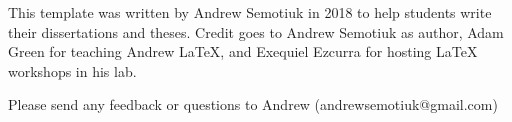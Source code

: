 This template was written by Andrew Semotiuk in 2018 to help students write their dissertations and theses. Credit goes to Andrew Semotiuk as author, Adam Green for teaching Andrew LaTeX, and Exequiel Ezcurra for hosting LaTeX workshops in his lab.

Please send any feedback or questions to Andrew (andrewsemotiuk@gmail.com)